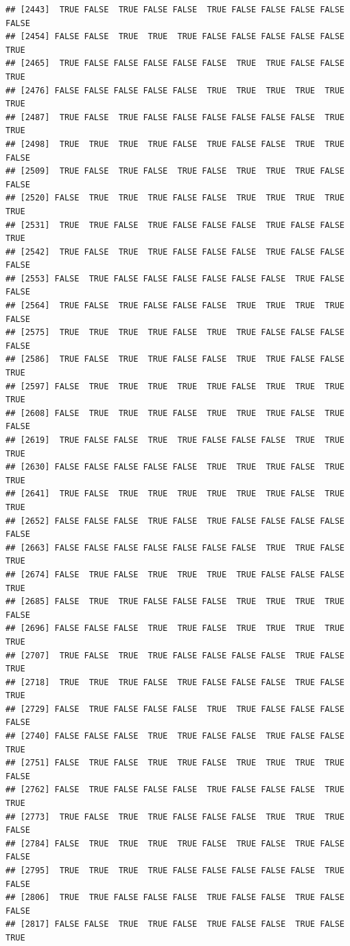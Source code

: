 \documentclass{article}\usepackage[]{graphicx}\usepackage[]{color}
\makeatletter
\newenvironment{kframe}{%
 \def\at@end@of@kframe{}%
 \ifinner\ifhmode%
  \def\at@end@of@kframe{\end{minipage}}%
  \begin{minipage}{\columnwidth}%
 \fi\fi%
 \def\FrameCommand##1{\hskip\@totalleftmargin \hskip-\fboxsep
 \colorbox{shadecolor}{##1}\hskip-\fboxsep
     \hskip-\linewidth \hskip-\@totalleftmargin \hskip\columnwidth}%
 \MakeFramed {\advance\hsize-\width
   \@totalleftmargin\z@ \linewidth\hsize
   \@setminipage}}%
 {\par\unskip\endMakeFramed%
 \at@end@of@kframe}
\newenvironment{knitrout}{}{} %
\makeatother
\begin{document}
\begin{knitrout}
\begin{kframe}
\begin{verbatim}
## [2443]  TRUE FALSE  TRUE FALSE FALSE  TRUE FALSE FALSE FALSE FALSE FALSE
## [2454] FALSE FALSE  TRUE  TRUE  TRUE FALSE FALSE FALSE FALSE FALSE  TRUE
## [2465]  TRUE FALSE FALSE FALSE FALSE FALSE  TRUE  TRUE FALSE FALSE  TRUE
## [2476] FALSE FALSE FALSE FALSE FALSE  TRUE  TRUE  TRUE  TRUE  TRUE  TRUE
## [2487]  TRUE FALSE  TRUE FALSE FALSE FALSE FALSE FALSE FALSE  TRUE  TRUE
## [2498]  TRUE  TRUE  TRUE  TRUE FALSE  TRUE FALSE FALSE  TRUE  TRUE FALSE
## [2509]  TRUE FALSE  TRUE FALSE  TRUE FALSE  TRUE  TRUE  TRUE FALSE FALSE
## [2520] FALSE  TRUE  TRUE  TRUE FALSE FALSE  TRUE  TRUE  TRUE  TRUE  TRUE
## [2531]  TRUE  TRUE FALSE  TRUE FALSE FALSE FALSE  TRUE FALSE FALSE  TRUE
## [2542]  TRUE FALSE  TRUE  TRUE FALSE FALSE FALSE  TRUE FALSE FALSE FALSE
## [2553] FALSE  TRUE FALSE FALSE FALSE FALSE FALSE FALSE  TRUE FALSE FALSE
## [2564]  TRUE FALSE  TRUE FALSE FALSE FALSE  TRUE  TRUE  TRUE  TRUE FALSE
## [2575]  TRUE  TRUE  TRUE  TRUE FALSE  TRUE  TRUE FALSE FALSE FALSE FALSE
## [2586]  TRUE FALSE  TRUE  TRUE FALSE FALSE  TRUE  TRUE FALSE FALSE  TRUE
## [2597] FALSE  TRUE  TRUE  TRUE  TRUE  TRUE FALSE  TRUE  TRUE  TRUE  TRUE
## [2608] FALSE  TRUE  TRUE  TRUE FALSE  TRUE  TRUE  TRUE FALSE  TRUE FALSE
## [2619]  TRUE FALSE FALSE  TRUE  TRUE FALSE FALSE FALSE  TRUE  TRUE  TRUE
## [2630] FALSE FALSE FALSE FALSE FALSE  TRUE  TRUE  TRUE FALSE  TRUE  TRUE
## [2641]  TRUE FALSE  TRUE  TRUE  TRUE  TRUE  TRUE  TRUE FALSE  TRUE  TRUE
## [2652] FALSE FALSE FALSE  TRUE FALSE  TRUE FALSE FALSE FALSE FALSE FALSE
## [2663] FALSE FALSE FALSE FALSE FALSE FALSE FALSE  TRUE  TRUE FALSE  TRUE
## [2674] FALSE  TRUE FALSE  TRUE  TRUE  TRUE  TRUE FALSE FALSE FALSE  TRUE
## [2685] FALSE  TRUE  TRUE FALSE FALSE FALSE  TRUE  TRUE  TRUE  TRUE FALSE
## [2696] FALSE FALSE FALSE  TRUE  TRUE FALSE  TRUE  TRUE  TRUE  TRUE  TRUE
## [2707]  TRUE FALSE  TRUE  TRUE FALSE FALSE FALSE FALSE  TRUE FALSE  TRUE
## [2718]  TRUE  TRUE  TRUE FALSE  TRUE FALSE FALSE FALSE  TRUE FALSE  TRUE
## [2729] FALSE  TRUE FALSE FALSE FALSE  TRUE  TRUE FALSE FALSE FALSE FALSE
## [2740] FALSE FALSE FALSE  TRUE  TRUE FALSE FALSE  TRUE FALSE FALSE  TRUE
## [2751] FALSE  TRUE FALSE  TRUE  TRUE FALSE  TRUE  TRUE  TRUE  TRUE FALSE
## [2762] FALSE  TRUE FALSE FALSE FALSE  TRUE FALSE FALSE FALSE  TRUE  TRUE
## [2773]  TRUE FALSE  TRUE  TRUE FALSE FALSE FALSE  TRUE  TRUE  TRUE FALSE
## [2784] FALSE  TRUE  TRUE  TRUE  TRUE FALSE  TRUE FALSE  TRUE FALSE FALSE
## [2795]  TRUE  TRUE  TRUE  TRUE FALSE FALSE FALSE FALSE FALSE  TRUE FALSE
## [2806]  TRUE  TRUE FALSE FALSE FALSE  TRUE FALSE FALSE  TRUE FALSE FALSE
## [2817] FALSE FALSE  TRUE  TRUE FALSE  TRUE FALSE FALSE  TRUE FALSE  TRUE

\end{verbatim}
\end{kframe}
\end{knitrout}
\end{document}
